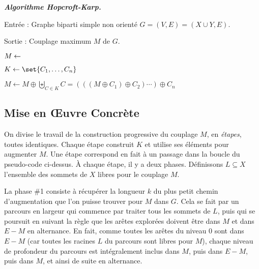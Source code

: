  
 \SEP \emph{\bfseries Algorithme Hopcroft-Karp.}
    
    Entrée : Graphe biparti simple non orienté $G = (V,E) = (X \cup Y, E)$.
    
    Sortie : Couplage maximum $M$ de $G$.
    \bigskip
    
    $M \leftarrow \empty$

    
    
    \hspace{2em} $K \leftarrow \set{C_1,\dots,C_n}$
    
        
    \hspace{2em} 
    
    \hspace{2em} 
    
    \hspace{2em}  
    
    \hspace{2em} $ M \leftarrow M \oplus \biguplus_{C \in K} C = (((M \oplus C_1) \oplus C_2) \cdots ) \oplus C_n$
    
     
    
 \SEP
 
  \subsection{Mise en Œuvre Concrète}
 
 On divise le travail de la construction progressive du couplage $M$, en \emph{étapes}, toutes identiques. Chaque étape construit $K$ et utilise ses éléments pour augmenter $M$. Une étape correspond en fait à un passage dans la boucle  du pseudo-code ci-dessus. À chaque étape, il y a deux phases. Définissons $L \subseteq X$ l'ensemble des sommets de $X$ libres pour le couplage $M$. \medskip
 
 La phase \#1 consiste à récupérer la longueur $k$ du plus petit chemin d'augmentation que l'on puisse trouver pour $M$ dans $G$. Cela se fait par un parcours en largeur qui commence par traiter tous les sommets de $L$, puis qui se poursuit en suivant la règle que les arêtes explorées doivent être dans $M$ et dans $E \minus M$ en alternance. En fait, comme toutes les arêtes du niveau $0$ sont dans $E\minus M$ (car toutes les racines $L$ du parcours sont libres pour $M$), chaque niveau de profondeur du parcours est intégralement inclus dans $M$, puis dans $E \minus M$, puis dans $M$, et ainsi de suite en alternance.
 
